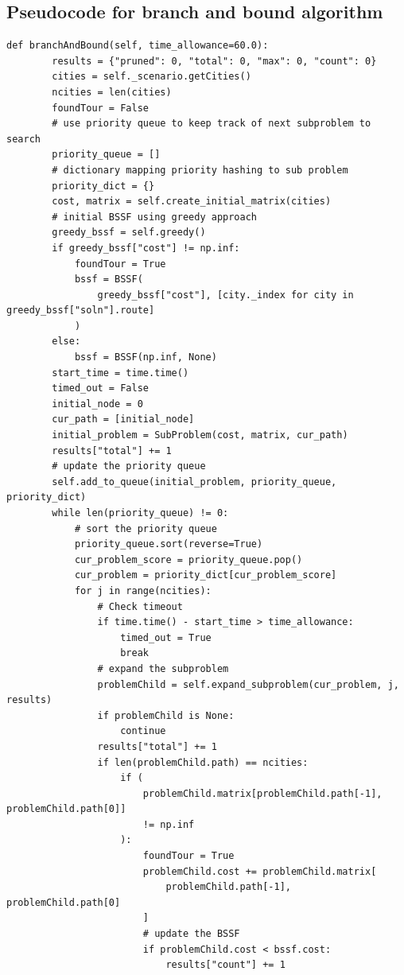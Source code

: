\documentclass[12pt]{article}
\begin{document}
\subsection{Pseudocode for branch and bound algorithm}
\begin{lstlisting}[style=mystyle]
    def branchAndBound(self, time_allowance=60.0):
        results = {"pruned": 0, "total": 0, "max": 0, "count": 0}
        cities = self._scenario.getCities()
        ncities = len(cities)
        foundTour = False
        # use priority queue to keep track of next subproblem to search
        priority_queue = []
        # dictionary mapping priority hashing to sub problem
        priority_dict = {}
        cost, matrix = self.create_initial_matrix(cities)
        # initial BSSF using greedy approach
        greedy_bssf = self.greedy()
        if greedy_bssf["cost"] != np.inf:
            foundTour = True
            bssf = BSSF(
                greedy_bssf["cost"], [city._index for city in greedy_bssf["soln"].route]
            )
        else:
            bssf = BSSF(np.inf, None)
        start_time = time.time()
        timed_out = False
        initial_node = 0
        cur_path = [initial_node]
        initial_problem = SubProblem(cost, matrix, cur_path)
        results["total"] += 1
        # update the priority queue
        self.add_to_queue(initial_problem, priority_queue, priority_dict)
        while len(priority_queue) != 0:
            # sort the priority queue
            priority_queue.sort(reverse=True)
            cur_problem_score = priority_queue.pop()
            cur_problem = priority_dict[cur_problem_score]
            for j in range(ncities):
                # Check timeout
                if time.time() - start_time > time_allowance:
                    timed_out = True
                    break
                # expand the subproblem
                problemChild = self.expand_subproblem(cur_problem, j, results)
                if problemChild is None:
                    continue
                results["total"] += 1
                if len(problemChild.path) == ncities:
                    if (
                        problemChild.matrix[problemChild.path[-1], problemChild.path[0]]
                        != np.inf
                    ):
                        foundTour = True
                        problemChild.cost += problemChild.matrix[
                            problemChild.path[-1], problemChild.path[0]
                        ]
                        # update the BSSF
                        if problemChild.cost < bssf.cost:
                            results["count"] += 1

\end{lstlisting}
\end{document}
